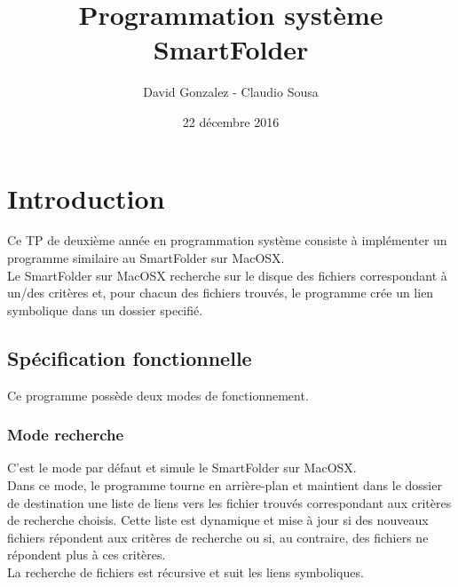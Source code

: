 \documentclass[11pt, a4paper]{article}
\begin{document}
\title
{
    \Huge{Programmation système} \\
    \Huge{SmartFolder}
}
\author
{
    \LARGE{David Gonzalez - Claudio Sousa}
}
\date{22 décembre 2016}
\maketitle

\begin{center}
\end{center}

\thispagestyle{empty}

\newpage

\section{Introduction}

Ce TP de deuxième année en programmation système consiste à implémenter un programme similaire au SmartFolder sur MacOSX. \\

Le SmartFolder sur MacOSX recherche sur le disque des fichiers correspondant à un/des critères et,
pour chacun des fichiers trouvés, le programme crée un lien symbolique dans un dossier specifié.

\subsection{Spécification fonctionnelle}
Ce programme possède deux modes de fonctionnement.

\subsubsection{Mode recherche}
C'est le mode par défaut et simule le SmartFolder sur MacOSX. \\

Dans ce mode, le programme tourne en arrière-plan et maintient dans le dossier de destination une liste de liens vers les fichier trouvés correspondant aux critères de recherche choisis.
Cette liste est dynamique et mise à jour si des nouveaux fichiers répondent aux critères de recherche ou si, au contraire, des fichiers ne répondent plus à ces critères. \\

La recherche de fichiers est récursive et suit les liens symboliques.
\end{document}
